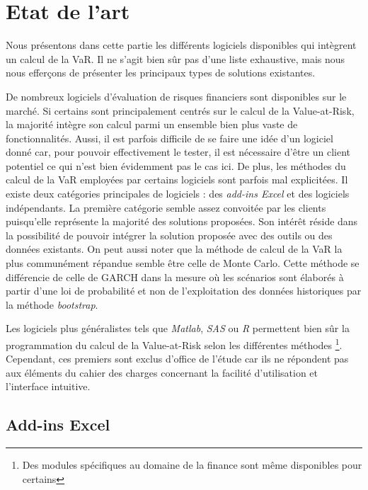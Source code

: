 \chapter{Etat de l'art}

	Nous présentons dans cette partie les différents logiciels disponibles qui intègrent un calcul de la VaR. Il ne s'agit bien sûr pas d'une liste exhaustive, mais nous nous efferçons de présenter les principaux types de solutions existantes.

	De nombreux logiciels d’évaluation de risques financiers sont disponibles sur le marché. Si certains sont principalement centrés sur le calcul de la Value-at-Risk, la majorité intègre son calcul parmi un ensemble bien plus vaste de fonctionnalités. 
	Aussi, il est parfois difficile de se faire une idée d’un logiciel donné car, pour pouvoir effectivement le tester, il est nécessaire d’être un client potentiel ce qui n'est bien évidemment pas le cas ici. De plus, les méthodes du calcul de la VaR employées par certains logiciels sont parfois mal explicitées.
	Il existe deux catégories principales de logiciels : des \textit{add-ins Excel} et des logiciels indépendants. La première catégorie semble assez convoitée par les clients puisqu'elle représente la majorité des solutions proposées. Son intérêt réside dans la possibilité de pouvoir intégrer la solution proposée avec des outils ou des données existants.
	On peut aussi noter que la méthode de calcul de la VaR la plus communément répandue semble être celle de Monte Carlo. Cette méthode se différencie de celle de GARCH dans la mesure où les scénarios sont élaborés à partir d'une loi de probabilité et non de l'exploitation des données historiques par la méthode \textit{bootstrap}.

	Les logiciels plus généralistes tels que \textit{Matlab}, \textit{SAS} ou \textit{R} permettent bien sûr la programmation du calcul de la Value-at-Risk selon les différentes méthodes \footnote{Des modules spécifiques au domaine de la finance sont même disponibles pour certains}. Cependant, ces premiers sont exclus d'office de l'étude car ils ne répondent pas aux éléments du cahier des charges concernant la facilité d'utilisation et l'interface intuitive.


	\section{Add-ins Excel}

